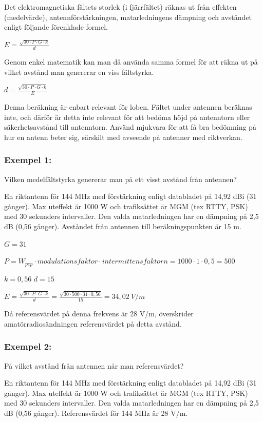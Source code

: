 Det elektromagnetiska fältets storlek (i fjärrfältet) räknas ut från
effekten (medelvärde), antennförstärkningen, matarledningens dämpning
och avståndet enligt följande förenklade formel.

\(E=\frac{\sqrt{30 \cdot P \cdot G \cdot k}}{d}\)

Genom enkel matematik kan man då använda samma formel för att räkna
ut på vilket avstånd man genererar en viss fältstyrka.

\(d=\frac{\sqrt{30 \cdot P \cdot G \cdot k}}{E}\)

Denna beräkning är enbart relevant för loben. Fältet under antennen
beräknas inte, och därför är detta inte relevant för att bedöma höjd
på antenntorn eller säkerhetsavstånd till antenntorn. Använd mjukvara för
att få bra bedömning på hur en antenn beter sig, särskilt med avseende på
antenner med riktverkan.

\subsubsection{Exempel 1:}

Vilken medelfältstyrka genererar man på ett visst avstånd från antennen?

En riktantenn för 144 MHz med förstärkning enligt databladet på
14,92 dBi (31 gånger).
Max uteffekt är 1000 W och trafiksättet är MGM (tex RTTY, PSK) med
30 sekunders intervaller.
Den valda matarledningen har en dämpning på 2,5 dB (0,56 gånger).
Avståndet från antennen till beräkningspunkten är 15 m.

\(G = 31\)

\(P = W_{pep} \cdot modulationsfaktor \cdot intermittensfaktorn
= 1000 \cdot 1 \cdot 0,5 = 500\)

\(k = 0,56\)
\(d = 15\)

\(E = \frac{\sqrt{30 \cdot P \cdot G \cdot k}}{d}
= \frac{\sqrt{30 \cdot 500 \cdot 31 \cdot 0,56}}{15}
= 34,02\ V/m\)

Då referensvärdet på denna frekvens är 28 V/m, överskrider
amatörradiosändningen referensvärdet på detta avstånd.

\subsubsection{Exempel 2:}

På vilket avstånd från antennen når man referensvärdet?

En riktantenn för 144 MHz med förstärkning enligt databladet på
14,92 dBi (31 gånger).
Max uteffekt är 1000 W och trafiksättet är MGM (tex RTTY, PSK) med
30 sekunders intervaller.
Den valda matarledningen har en dämpning på 2,5 dB (0,56 gånger).
Referensvärdet för 144 MHz är 28 V/m.

